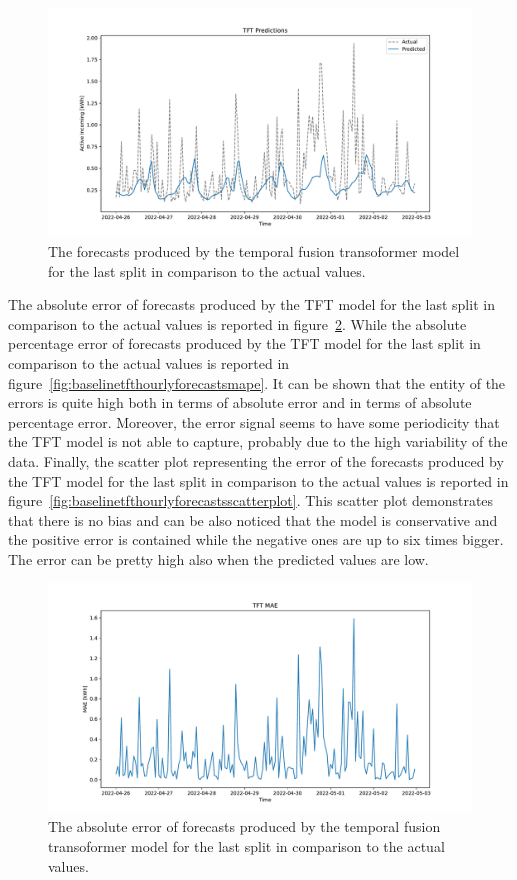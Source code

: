 \begin{figure}[H]
\centering
\includegraphics[width=1\textwidth]{images/baseline/TFT}
\caption{The forecasts produced by the temporal fusion transoformer model for the last split in comparison to the actual values.}
\label{fig:baselinetfthourlyforecasts}
\end{figure}

The absolute error of forecasts produced by the TFT model for the last split in comparison to the actual values is reported in figure~\ref{fig:baselinetfthourlyforecastsmae}.
While the absolute percentage error of forecasts produced by the TFT model for the last split in comparison to the actual values is reported in figure~\ref{fig:baselinetfthourlyforecastsmape}.
It can be shown that the entity of the errors is quite high both in terms of absolute error and in terms of absolute percentage error.
Moreover, the error signal seems to have some periodicity that the TFT model is not able to capture, probably due to the high variability of the data.
Finally, the scatter plot representing the error of the forecasts produced by the TFT model for the last split in comparison to the actual values is reported in figure~\ref{fig:baselinetfthourlyforecastsscatterplot}.
This scatter plot demonstrates that there is no bias and can be also noticed that the model is conservative and the positive error is contained while the negative ones are up to six times bigger.
The error can be pretty high also when the predicted values are low.

\begin{figure}[H]
\centering
\includegraphics[width=1\textwidth]{images/baseline/TFT_mae}
\caption{The absolute error of forecasts produced by the temporal fusion transoformer model for the last split in comparison to the actual values.}
\label{fig:baselinetfthourlyforecastsmae}
\end{figure}

